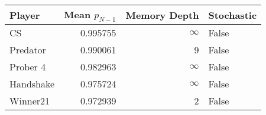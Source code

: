 \begin{tabular}{lrrl}
\toprule
    Player &  Mean $p_{N-1}$ &  Memory Depth & Stochastic \\
\midrule
        CS &        0.995755 &            \(\infty\) &      False \\
  Predator &        0.990061 &             9 &      False \\
  Prober 4 &        0.982963 &            \(\infty\) &      False \\
 Handshake &        0.975724 &            \(\infty\) &      False \\
  Winner21 &        0.972939 &             2 &      False \\
\bottomrule
\end{tabular}
